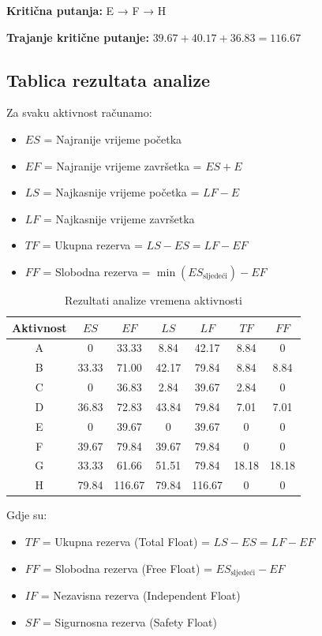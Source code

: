 \documentclass[12pt,a4paper]{article}
\begin{document}
\textbf{Kritična putanja:} E → F → H

\textbf{Trajanje kritične putanje:} $39.67 + 40.17 + 36.83 = 116.67$

\subsection{Tablica rezultata analize}

Za svaku aktivnost računamo:
\begin{itemize}
\item $ES$ = Najranije vrijeme početka
\item $EF$ = Najranije vrijeme završetka = $ES + E$
\item $LS$ = Najkasnije vrijeme početka = $LF - E$
\item $LF$ = Najkasnije vrijeme završetka
\item $TF$ = Ukupna rezerva = $LS - ES = LF - EF$
\item $FF$ = Slobodna rezerva = $\min(ES_{\text{sljedeći}}) - EF$
\end{itemize}

\begin{table}[h]
\centering
\small
\begin{tabular}{ccccccc}
\toprule
Aktivnost & $ES$ & $EF$ & $LS$ & $LF$ & $TF$ & $FF$ \\
\midrule
A & 0 & 33.33 & 8.84 & 42.17 & 8.84 & 0 \\
B & 33.33 & 71.00 & 42.17 & 79.84 & 8.84 & 8.84 \\
C & 0 & 36.83 & 2.84 & 39.67 & 2.84 & 0 \\
D & 36.83 & 72.83 & 43.84 & 79.84 & 7.01 & 7.01 \\
E & 0 & 39.67 & 0 & 39.67 & 0 & 0 \\
F & 39.67 & 79.84 & 39.67 & 79.84 & 0 & 0 \\
G & 33.33 & 61.66 & 51.51 & 79.84 & 18.18 & 18.18 \\
H & 79.84 & 116.67 & 79.84 & 116.67 & 0 & 0 \\
\bottomrule
\end{tabular}
\caption{Rezultati analize vremena aktivnosti}
\end{table}

Gdje su:
\begin{itemize}
\item $TF$ = Ukupna rezerva (Total Float) = $LS - ES = LF - EF$
\item $FF$ = Slobodna rezerva (Free Float) = $ES_{\text{sljedeći}} - EF$
\item $IF$ = Nezavisna rezerva (Independent Float)
\item $SF$ = Sigurnosna rezerva (Safety Float)
\end{itemize}
\end{document}
